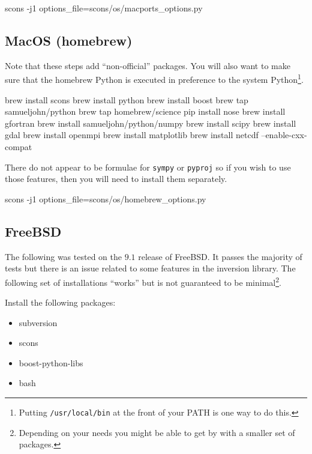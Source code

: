 \begin{shellCode}
scons -j1 options_file=scons/os/macports_options.py 
\end{shellCode}


\subsection{MacOS (homebrew)}\label{sec:homebrewsrc}

Note that these steps add ``non-official'' packages.
You will also want to make sure that the homebrew Python is executed in preference to the system 
Python\footnote{Putting \texttt{/usr/local/bin} at the front of your PATH is one way to do this.}.

\begin{shellCode}
brew install scons
brew install python
brew install boost
brew tap samueljohn/python
brew tap homebrew/science
pip install nose
brew install gfortran
brew install samueljohn/python/numpy
brew install scipy
brew install gdal
brew install openmpi
brew install matplotlib
brew install netcdf --enable-cxx-compat
\end{shellCode}

There do not appear to be formulae for \texttt{sympy} or \texttt{pyproj} so if you wish to use those features, then
you will need to install them separately.


\begin{shellCode}
scons -j1 options_file=scons/os/homebrew_options.py
\end{shellCode}


\subsection{FreeBSD}\label{sec:freebsdsrc}
The following was tested on the $9.1$ release of FreeBSD.
It passes the majority of tests but there is an issue related to some features in the inversion library.
The following set of installations ``works'' but is not guaranteed to be minimal\footnote{Depending on your needs you might be able to
get by with a smaller set of packages.}.

Install the following packages:
\begin{itemize}
 \item subversion
 \item scons
 \item boost-python-libs
 \item bash
\end{itemize}

